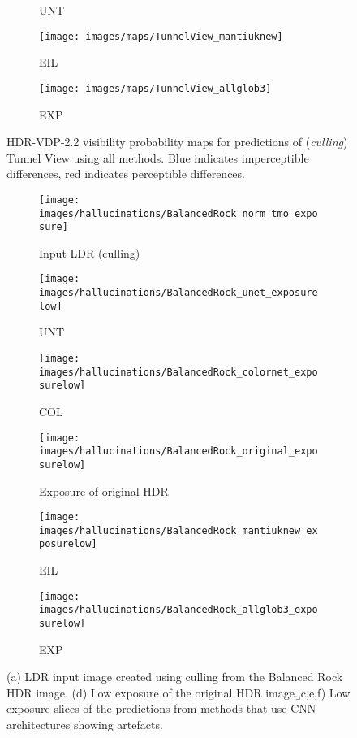 \documentclass{egpubl}
\begin{document}
\begin{figure*}[htb]
\begin{subfigure}[t]{0.13\linewidth}
        \caption{UNT}
    \end{subfigure}
    \begin{subfigure}[t]{0.13\linewidth}
        \centering
        \texttt{[image: images/maps/TunnelView\_mantiuknew]}
        \caption{EIL}
    \end{subfigure}
    \begin{subfigure}[t]{0.13\linewidth}
        \centering
        \texttt{[image: images/maps/TunnelView\_allglob3]}
        \caption{EXP}
    \end{subfigure}
    \caption{HDR-VDP-2.2 visibility probability maps for predictions of
    (\textit{culling}) Tunnel View using all methods. Blue indicates
    imperceptible differences, red indicates perceptible
    differences.}\label{fig:mapsbad}
\end{figure*}
 \begin{figure*}[htb]
    \centering
    \begin{subfigure}[t]{0.27\linewidth}
        \centering
        \texttt{[image: images/hallucinations/BalancedRock\_norm\_tmo\_exposure]}
        \caption{Input LDR (culling)}
    \end{subfigure}
    \begin{subfigure}[t]{0.27\linewidth}
        \centering
        \texttt{[image: images/hallucinations/BalancedRock\_unet\_exposurelow]}
        \caption{UNT}
    \end{subfigure}
    \begin{subfigure}[t]{0.27\linewidth}
        \centering
        \texttt{[image: images/hallucinations/BalancedRock\_colornet\_exposurelow]}
        \caption{COL}
    \end{subfigure}
    \begin{subfigure}[t]{0.27\linewidth}
        \centering
        \texttt{[image: images/hallucinations/BalancedRock\_original\_exposurelow]}
        \caption{Exposure of original HDR}
    \end{subfigure}
    \begin{subfigure}[t]{0.27\linewidth}
        \centering
        \texttt{[image: images/hallucinations/BalancedRock\_mantiuknew\_exposurelow]}
        \caption{EIL}
    \end{subfigure}
    \begin{subfigure}[t]{0.27\linewidth}
        \centering
        \texttt{[image: images/hallucinations/BalancedRock\_allglob3\_exposurelow]}
        \caption{EXP}
    \end{subfigure}
    \caption{(a) LDR input image created using culling from the Balanced Rock HDR image. (d) Low exposure of the
    original HDR image.\b,c,e,f) Low exposure
    slices of the predictions from methods that use CNN architectures showing
    artefacts.}\label{fig:hallucinations_grotto}
\end{figure*}  
\end{document}
